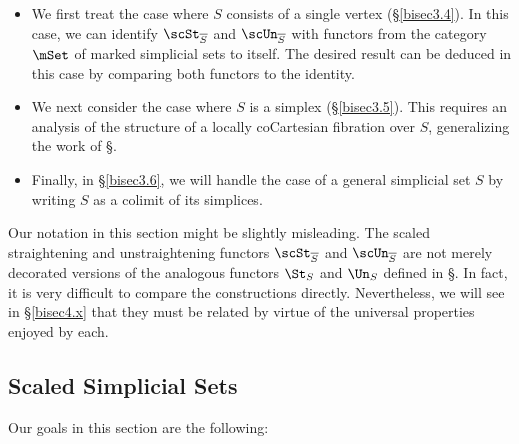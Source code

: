 \begin{itemize}
\item[$(a)$] We first treat the case where $S$ consists of a single vertex (\S \ref{bisec3.4}). In this case,
we can identify $\scSt_{ \overline{S} }$ and $\scUn_{ \overline{S} }$ with functors from the category
$\mSet$ of marked simplicial sets to itself. The desired result can be deduced in this case by
comparing both functors to the identity.

\item[$(b)$] We next consider the case where $S$ is a simplex (\S \ref{bisec3.5}). This requires an analysis of the structure of a locally coCartesian fibration over $S$, generalizing the work
of \S {}.

\item[$(c)$] Finally, in \S \ref{bisec3.6}, we will handle the case of a general simplicial set $S$
by writing $S$ as a colimit of its simplices.
\end{itemize}

\begin{warning}
Our notation in this section might be slightly misleading. The scaled straightening and unstraightening functors $\scSt_{ \overline{S} }$ and $\scUn_{ \overline{S} }$ are not merely decorated versions of the analogous functors $\St_{S}$ and $\Un_{S}$ defined in \S {}. In fact, it is very difficult to compare the constructions directly. Nevertheless, we will see in \S \ref{bisec4.x} that they must be related by virtue of the universal properties enjoyed by each.
\end{warning}

\subsection{Scaled Simplicial Sets}\label{bisec3.1}

Our goals in this section are the following:

